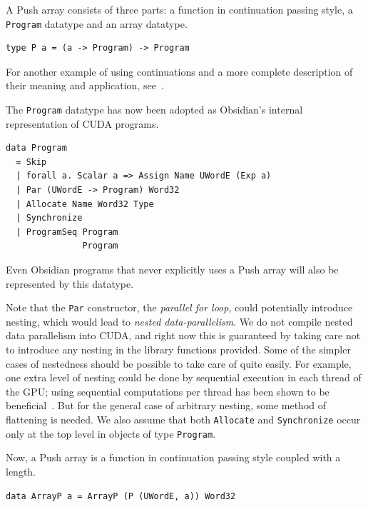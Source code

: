 \documentclass[]{sigplanconf}
\begin{document}

A Push array consists of three parts: a function in continuation passing style, 
a {\tt Program} datatype and an array datatype. 

\begin{codesize}
\begin{verbatim}
type P a = (a -> Program) -> Program 
\end{verbatim}
\end{codesize}

\noindent
For another example of using continuations and a more complete
description of their meaning and application, see~\cite{POORKOEN}. 

The {\tt Program} datatype has now been adopted as Obsidian's internal 
representation of CUDA programs.

\begin{codesize}
\begin{verbatim}
data Program
  = Skip
  | forall a. Scalar a => Assign Name UWordE (Exp a) 
  | Par (UWordE -> Program) Word32   
  | Allocate Name Word32 Type 
  | Synchronize 
  | ProgramSeq Program 
               Program 
\end{verbatim}
\end{codesize}

\noindent
Even Obsidian programs 
that never explicitly uses a Push array will also be represented by this 
datatype. 

Note that the {\tt Par} constructor, 
the {\em parallel for loop}, could potentially introduce nesting, which would lead 
to {\em nested data-parallelism}. We do not compile nested data parallelism 
into CUDA, and right now this is guaranteed by taking care not to introduce 
any nesting in the library functions provided. Some of the 
simpler cases of nestedness should be possible to take care of quite easily. 
For example, one extra level of nesting could be done by sequential execution 
in each thread of the GPU; using sequential computations per thread has 
been shown to be beneficial~\cite{OLAMARCUS}. But for the general case 
of arbitrary nesting, some method of flattening is needed. 
We also assume that both {\tt Allocate} and {\tt Synchronize} occur only at the top level in objects of type {\tt Program}. 

Now, a Push array is a function in continuation passing style
coupled with a length. 

\begin{codesize}
\begin{verbatim}
data ArrayP a = ArrayP (P (UWordE, a)) Word32
\end{verbatim}
\end{codesize}
\end{document}
